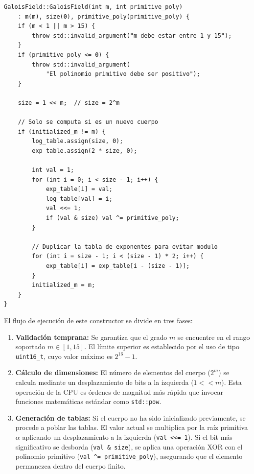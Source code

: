 \begin{lstlisting}[style=CodigoCPP, caption={Implementación del constructor de \texttt{GaloisField} y generación de las tablas exponencial y logarítmica.}, label={lst:gf_constructor}]
GaloisField::GaloisField(int m, int primitive_poly) 
    : m(m), size(0), primitive_poly(primitive_poly) {
    if (m < 1 || m > 15) {
        throw std::invalid_argument("m debe estar entre 1 y 15");
    }
    if (primitive_poly <= 0) {
        throw std::invalid_argument(
            "El polinomio primitivo debe ser positivo");
    }
    
    size = 1 << m;  // size = 2^m

    // Solo se computa si es un nuevo cuerpo
    if (initialized_m != m) {
        log_table.assign(size, 0);
        exp_table.assign(2 * size, 0);

        int val = 1;
        for (int i = 0; i < size - 1; i++) {
            exp_table[i] = val;
            log_table[val] = i;
            val <<= 1;
            if (val & size) val ^= primitive_poly;
        }

        // Duplicar la tabla de exponentes para evitar modulo
        for (int i = size - 1; i < (size - 1) * 2; i++) {
            exp_table[i] = exp_table[i - (size - 1)];
        }
        initialized_m = m;
    }
}
\end{lstlisting}

El flujo de ejecución de este constructor se divide en tres fases:

\begin{enumerate}
    \item \textbf{Validación temprana:} Se garantiza que el grado $m$ se encuentre en el rango soportado $m \in [1, 15]$. El límite superior es establecido por el uso de tipo \texttt{uint16\_t}, cuyo valor máximo es $2^{16}-1$.
    
    \item \textbf{Cálculo de dimensiones:} El número de elementos del cuerpo ($2^m$) se calcula mediante un desplazamiento de bits a la izquierda (\texttt{$1 << m$}). Esta operación de la CPU es órdenes de magnitud más rápida que invocar funciones matemáticas estándar como \texttt{std::pow}.
    
    \item \textbf{Generación de tablas:} Si el cuerpo no ha sido inicializado previamente, se procede a poblar las tablas. El valor actual se multiplica por la raíz primitiva $\alpha$ aplicando un desplazamiento a la izquierda (\texttt{val <{}<= 1}). Si el bit más significativo se desborda (\texttt{val \& size}), se aplica una operación XOR con el polinomio primitivo (\texttt{val \textasciicircum{}= primitive\_poly}), asegurando que el elemento permanezca dentro del cuerpo finito.
\end{enumerate}


